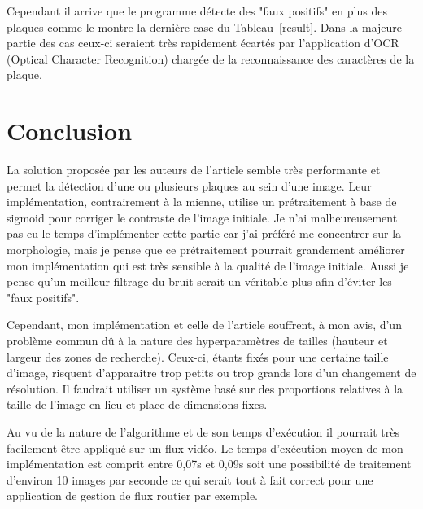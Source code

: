 \documentclass[a4paper,10pt,twocolumn]{article}
\begin{document}
Cependant il arrive que le programme détecte des "faux positifs" en plus des plaques comme le montre la dernière case du Tableau~\ref{result}. Dans la majeure partie des cas ceux-ci seraient très rapidement écartés par l'application d'OCR (Optical Character Recognition) chargée de la reconnaissance des caractères de la plaque.

\section{Conclusion}
La solution proposée par les auteurs de l'article semble très performante et permet la détection d'une ou plusieurs plaques au sein d'une image. Leur implémentation, contrairement à la mienne, utilise un prétraitement à base de sigmoid pour corriger le contraste de l'image initiale. Je n'ai malheureusement pas eu le temps d'implémenter cette partie car j'ai préféré me concentrer sur la morphologie, mais je pense que ce prétraitement pourrait grandement améliorer mon implémentation qui est très sensible à la qualité de l'image initiale. Aussi je pense qu'un meilleur filtrage du bruit serait un véritable plus afin d'éviter les "faux positifs".

Cependant, mon implémentation et celle de l'article souffrent, à mon avis, d'un problème commun dû à la nature des hyperparamètres de tailles (hauteur et largeur des zones de recherche). Ceux-ci, étants fixés pour une certaine taille d'image, risquent d'apparaitre trop petits ou trop grands lors d'un changement de résolution. Il faudrait utiliser un système basé sur des proportions relatives à la taille de l'image en lieu et place de dimensions fixes. 

Au vu de la nature de l'algorithme et de son temps d'exécution il pourrait très facilement être appliqué sur un flux vidéo. Le temps d'exécution moyen de mon implémentation est comprit entre 0,07s et 0,09s soit une possibilité de traitement d'environ 10 images par seconde ce qui serait tout à fait correct pour une application de gestion de flux routier par exemple. 
\end{document}
